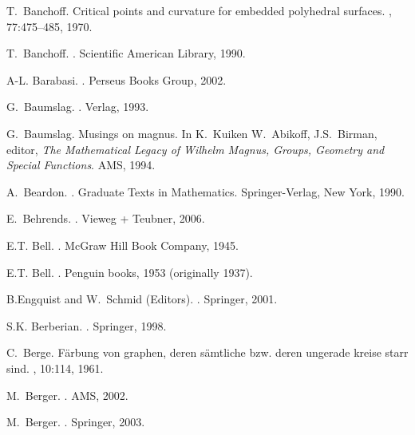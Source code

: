 \documentclass[12pt]{amsart}
\begin{document}
\begin{thebibliography}{100}
T.~Banchoff.
\newblock Critical points and curvature for embedded polyhedral surfaces.
, 77:475--485, 1970.

T.~Banchoff.
.
\newblock Scientific American Library, 1990.

A-L. Barabasi.
.
\newblock Perseus Books Group, 2002.

G.~Baumslag.
.
 Verlag, 1993.

G.~Baumslag.
\newblock Musings on magnus.
\newblock In K.~Kuiken W.~Abikoff, J.S.~Birman, editor, {\em The Mathematical
  Legacy of Wilhelm Magnus, Groups, Geometry and Special Functions}. AMS, 1994.

A.~Beardon.
.
\newblock Graduate Texts in Mathematics. Springer-Verlag, New York, 1990.

E.~Behrends.
.
\newblock Vieweg + Teubner, 2006.

E.T. Bell.
.
\newblock McGraw Hill Book Company, 1945.

E.T. Bell.
.
\newblock Penguin books, 1953 (originally 1937).

B.Engquist and W.~Schmid (Editors).
.
\newblock Springer, 2001.

S.K. Berberian.
.
\newblock Springer, 1998.

C.~Berge.
\newblock F\"arbung von graphen, deren s\"amtliche bzw. deren ungerade kreise
  starr sind.
, 10:114, 1961.

M.~Berger.
.
\newblock AMS, 2002.

M.~Berger.
.
\newblock Springer, 2003.


\end{thebibliography}
\end{document}

